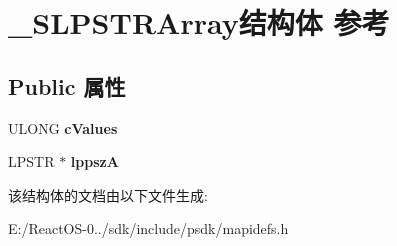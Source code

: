 \hypertarget{struct___s_l_p_s_t_r_array}{}\section{\+\_\+\+S\+L\+P\+S\+T\+R\+Array结构体 参考}
\label{struct___s_l_p_s_t_r_array}
\subsection*{Public 属性}
\begin{DoxyCompactItemize}
\item 
\mbox{\label{struct___s_l_p_s_t_r_array_aa9bb70bafecf57e84a5d9a2c2473c0ef}} 
U\+L\+O\+NG {\bfseries c\+Values}
\item 
\mbox{\label{struct___s_l_p_s_t_r_array_a5d08ece85bf69a00254e5f5b9449d303}} 
L\+P\+S\+TR $\ast$ {\bfseries lppszA}
\end{DoxyCompactItemize}


该结构体的文档由以下文件生成\+:\begin{DoxyCompactItemize}
\item 
E\+:/\+React\+O\+S-\/0../sdk/include/psdk/mapidefs.\+h\end{DoxyCompactItemize}
